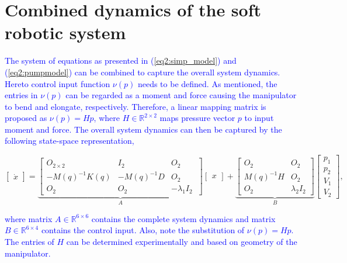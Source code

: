 \section{Combined dynamics of the soft robotic system}




\textcolor{blue}{The system of equations as presented in (\ref{eq2:simp_model}) and (\ref{eq2:pumpmodel}) can be combined to capture the overall system dynamics. Hereto control input function $\nu(p)$ needs to be defined. As mentioned, the entries in $\nu(p)$ can be regarded as a moment and force causing the manipulator to bend and elongate, respectively. Therefore, a linear mapping matrix is proposed as $\nu(p) = H p$, where $H \in \mathbb{R}^{2\times 2}$ maps pressure vector $p$ to input moment and force. The overall system dynamics can then be captured by the following state-space representation,}

\begin{equation}
     \begin{bmatrix} \dot{x}  \end{bmatrix}   =   \underbrace{ \begin{bmatrix} O_{2\times 2} & I_{2} & O_{2} \\ -M(q)^{-1}K(q)  & -M(q)^{-1} D & O_{2} \\
     O_{2} & O_{2}    & -\lambda_1 I_{2}\ \end{bmatrix}   }_A   \begin{bmatrix} x \end{bmatrix}  + \underbrace{      \begin{bmatrix} O_{2} & O_{2} \\ M(q)^{-1}H & O_{2} \\ O_{2} & \lambda_2 I_{2} \end{bmatrix} }_B      \begin{bmatrix} p_1 \\ p_2  \\ V_1 \\ V_2 \end{bmatrix},
     \label{eq:ssp}
\end{equation}

\textcolor{blue}{where matrix $A \in \mathbb{R}^{6\times 6}$ contains the complete system dynamics and matrix $B \in \mathbb{R}^{6\times 4}$ contains the control input. Also, note the substitution of $\nu(p) = Hp$. The entries of $H$ can be determined experimentally and based on geometry of the manipulator.}



